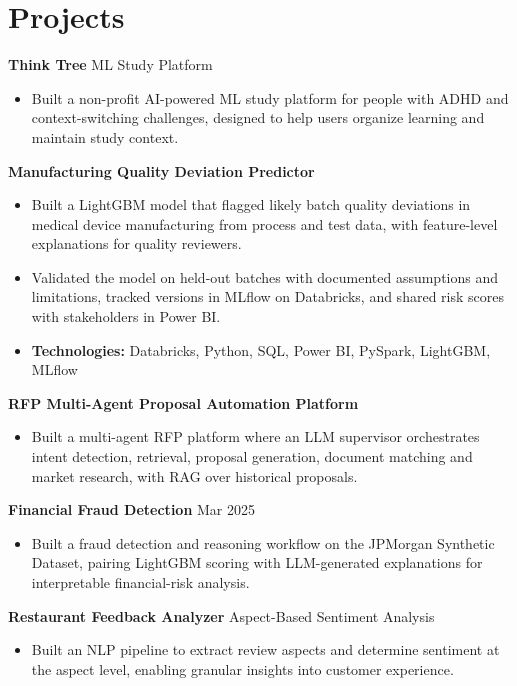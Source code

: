 \documentclass[10pt,a4paper]{article}
\begin{document}
\section{Projects}
\textbf{Think Tree} \textbar{} ML Study Platform\par
\begin{itemize}
  \item Built a non-profit AI-powered ML study platform for people with ADHD and context-switching challenges, designed to help users organize learning and maintain study context.
\end{itemize}
\textbf{Manufacturing Quality Deviation Predictor}\par
\begin{itemize}
  \item Built a LightGBM model that flagged likely batch quality deviations in medical device manufacturing from process and test data, with feature-level explanations for quality reviewers.
  \item Validated the model on held-out batches with documented assumptions and limitations, tracked versions in MLflow on Databricks, and shared risk scores with stakeholders in Power BI.
  \item \textbf{Technologies:} Databricks, Python, SQL, Power BI, PySpark, LightGBM, MLflow
\end{itemize}
\textbf{RFP Multi-Agent Proposal Automation Platform}\par
\begin{itemize}
  \item Built a multi-agent RFP platform where an LLM supervisor orchestrates intent detection, retrieval, proposal generation, document matching and market research, with RAG over historical proposals.
\end{itemize}
\textbf{Financial Fraud Detection} \textbar{} Mar 2025\par
\begin{itemize}
  \item Built a fraud detection and reasoning workflow on the JPMorgan Synthetic Dataset, pairing LightGBM scoring with LLM-generated explanations for interpretable financial-risk analysis.
\end{itemize}
\textbf{Restaurant Feedback Analyzer} \textbar{} Aspect-Based Sentiment Analysis\par
\begin{itemize}
  \item Built an NLP pipeline to extract review aspects and determine sentiment at the aspect level, enabling granular insights into customer experience.
\end{itemize}
\end{document}

